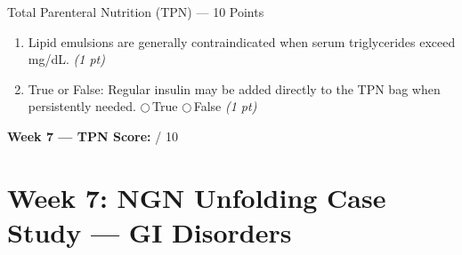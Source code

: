 \documentclass[11pt,letterpaper]{article}
\newcommand{\blank}[1][3cm]{\underline{\hspace{#1}}}
\begin{document}
\begin{diagbox}{Total Parenteral Nutrition (TPN) --- 10 Points}
\begin{enumerate}[leftmargin=1.5em, label=\textbf{\arabic*.},start=51]
  \item Lipid emulsions are generally contraindicated when serum triglycerides
        exceed \blank[2cm] mg/dL.
        \hfill\textit{(1 pt)}

  \item True or False: Regular insulin may be added directly to the TPN bag
        when persistently needed.
        \quad$\bigcirc$\,True \quad$\bigcirc$\,False
        \hfill\textit{(1 pt)}

\end{enumerate}

\vspace{0.3cm}
\textbf{Week 7 --- TPN Score:} \blank[1cm] / 10
\end{diagbox}

\newpage

\section{Week 7: NGN Unfolding Case Study --- GI Disorders}
\end{document}
